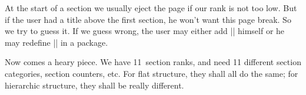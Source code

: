 \documentclass{progltx}
\begin{document}
\sect At the start of a section we usually eject the page if our rank
is not too low. But if the user had a title above the first section,
he won't want this page break. So we try to guess it. If we guess
wrong, the user may either add |\newpage| himself or he may redefine
|\CwebEjectSection| in a package.

\beginprog
\def\CwebEjectSection#1{%
    \gdef\CwebEjectSection##1{%
	\relax
        \ifnum ##1<\CwebRankNoEject\relax
            \newpage
        \fi
	}%
    }

\if@titlepage
    \CwebEjectSection{}
\fi
\endprog


\sect Now comes a heary piece. We have 11~section ranks, and need 11
different section categories, section counters, etc. For flat
structure, they shall all do the same; for hierarchic structure, they
shall be really different.
\end{document}
